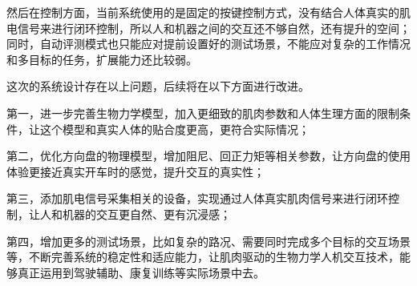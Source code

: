 然后在控制方面，当前系统使用的是固定的按键控制方式，没有结合人体真实的肌电信号来进行闭环控制，所以人和机器之间的交互还不够自然，还有提升的空间；同时，自动评测模式也只能应对提前设置好的测试场景，不能应对复杂的工作情况和多目标的任务，扩展能力还比较弱。

这次的系统设计存在以上问题，后续将在以下方面进行改进。

第一，进一步完善生物力学模型，加入更细致的肌肉参数和人体生理方面的限制条件，让这个模型和真实人体的贴合度更高，更符合实际情况；

第二，优化方向盘的物理模型，增加阻尼、回正力矩等相关参数，让方向盘的使用体验更接近真实开车时的感觉，提升交互的真实性；

第三，添加肌电信号采集相关的设备，实现通过人体真实肌肉信号来进行闭环控制，让人和机器的交互更自然、更有沉浸感；

第四，增加更多的测试场景，比如复杂的路况、需要同时完成多个目标的交互场景等，不断完善系统的稳定性和适应能力，让肌肉驱动的生物力学人机交互技术，能够真正运用到驾驶辅助、康复训练等实际场景中去。
